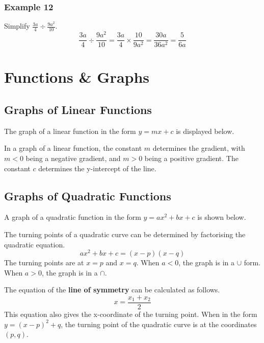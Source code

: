 \documentclass{report}
\begin{document}
\begin{flushleft}
\subsubsection{Example 12}
Simplify $\frac{3a}{4}\div\frac{9a^2}{10}$.
\[\frac{3a}{4}\div\frac{9a^2}{10}=\frac{3a}{4}\times\frac{10}{9a^2}=\frac{30a}{36a^2}=\frac{5}{6a}\]


\section{Functions \& Graphs}

\subsection{Graphs of Linear Functions}
The graph of a linear function in the form $y=mx+c$ is displayed below.
\par
In a graph of a linear function, the constant $m$ determines the gradient, with $m<0$ being a negative gradient, and $m>0$ being a positive gradient. The constant $c$ determines the y-intercept of the line.

\subsection{Graphs of Quadratic Functions}
A graph of a quadratic function in the form $y=ax^2+bx+c$ is shown below.
\par The turning points of a quadratic curve can be determined by factorising the quadratic equation.
\begin{equation}
    ax^2+bx+c=(x-p)(x-q)
\end{equation}
The turning points are at $x=p$ and $x=q$. When $a<0$, the graph is in a \textit{$\cup$} form. When $a>0$, the graph is in a \textit{$\cap$}. 
\par
The equation of the \textbf{line of symmetry} can be calculated as follows.
\begin{equation}
    x=\frac{x_1+x_2}{2}
\end{equation}
This equation also gives the x-coordinate of the turning point. When in the form $y=(x-p)^2+q$, the turning point of the quadratic curve is at the coordinates $(p,q)$.


\end{flushleft}
\end{document}
